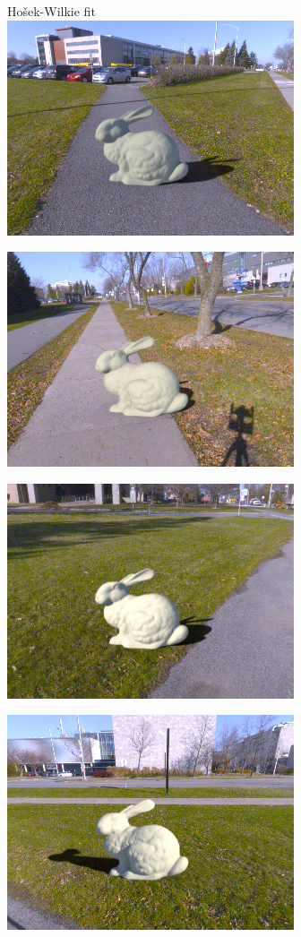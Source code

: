 \begin{minipage}{\linewidth}
\begin{multicols}{4}
\vfill\null
\columnbreak

Hošek-Wilkie fit\\

\includegraphics[width=\mywidth]{AG8A2749_Panorama_hdr-corrected_004.jpg}

\includegraphics[width=\mywidth]{AG8A2791_Panorama_hdr-corrected_002.jpg}

\includegraphics[width=\mywidth]{AG8A2833_Panorama_hdr-corrected_006.jpg}

\includegraphics[width=\mywidth]{AG8A2833_Panorama_hdr-corrected_007.jpg}



\end{multicols}
\end{minipage}
